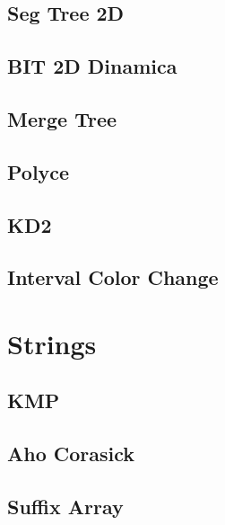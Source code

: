 \subsection{Seg Tree 2D}
\raggedbottom
\hrulefill
\subsection{BIT 2D Dinamica}
\raggedbottom
\hrulefill
\subsection{Merge Tree}
\raggedbottom
\hrulefill
\subsection{Polyce}
\raggedbottom
\hrulefill
\subsection{KD2}
\raggedbottom
\hrulefill
\subsection{Interval Color Change}
\raggedbottom
\hrulefill

\section{Strings}
\subsection{KMP}
\raggedbottom
\hrulefill
\subsection{Aho Corasick}
\raggedbottom
\hrulefill
\subsection{Suffix Array}
\raggedbottom
\hrulefill
